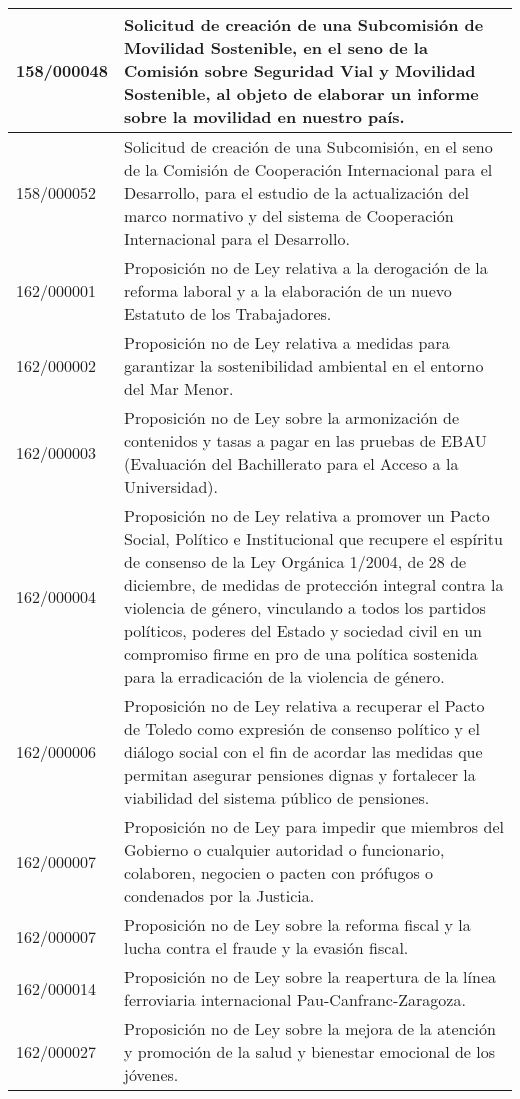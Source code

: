 {\begin{table}[H]
\begin{center}
\begin{tabularx}{\linewidth}{| l | X |}
\hline
158/000048 & Solicitud de creación de una Subcomisión de Movilidad Sostenible, en el seno de la Comisión sobre Seguridad Vial y Movilidad Sostenible, al objeto de elaborar un informe sobre la movilidad en nuestro país. \\
\hline
158/000052 & Solicitud de creación de una Subcomisión, en el seno de la Comisión de Cooperación Internacional para el Desarrollo, para el estudio de la actualización del marco normativo y del sistema de Cooperación Internacional para el Desarrollo. \\
\hline
162/000001 & Proposición no de Ley relativa a la derogación de la reforma laboral y a la elaboración de un nuevo Estatuto de los Trabajadores. \\
\hline
162/000002 & Proposición no de Ley relativa a medidas para garantizar la sostenibilidad ambiental en el entorno del Mar Menor. \\
\hline
162/000003 & Proposición no de Ley sobre la armonización de contenidos y tasas a pagar en las pruebas de EBAU (Evaluación del Bachillerato para el Acceso a la Universidad). \\
\hline
162/000004 & Proposición no de Ley relativa a promover un Pacto Social, Político e Institucional que recupere el espíritu de consenso de la Ley Orgánica 1/2004, de 28 de diciembre, de medidas de protección integral contra la violencia de género, vinculando a todos los partidos políticos, poderes del Estado y sociedad civil en un compromiso firme en pro de una política sostenida para la erradicación de la violencia de género. \\
\hline
162/000006 & Proposición no de Ley relativa a recuperar el Pacto de Toledo como expresión de consenso político y el diálogo social con el fin de acordar las medidas que permitan asegurar pensiones dignas y fortalecer la viabilidad del sistema público de pensiones. \\
\hline
162/000007 & Proposición no de Ley para impedir que miembros del Gobierno o cualquier autoridad o funcionario, colaboren, negocien o pacten con prófugos o condenados por la Justicia. \\
\hline
162/000007 & Proposición no de Ley sobre la reforma fiscal y la lucha contra el fraude y la evasión fiscal. \\
\hline
162/000014 & Proposición no de Ley sobre la reapertura de la línea ferroviaria internacional Pau-Canfranc-Zaragoza. \\
\hline
162/000027 & Proposición no de Ley sobre la mejora de la atención y promoción de la salud y bienestar emocional de los jóvenes. \\

\end{tabularx}
\end{center}
\end{table}}
